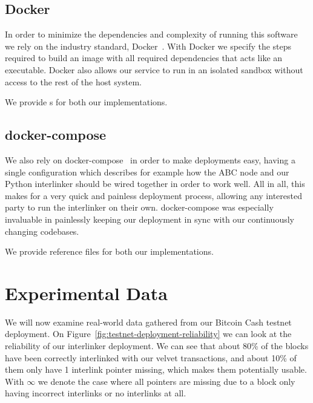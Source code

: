 \subsection{Docker}

In order to minimize the dependencies and complexity of running this software we rely on the industry standard, Docker~\cite{docker}. With Docker we specify the steps required to build an image with all required dependencies that acts like an executable. Docker also allows our service to run in an isolated sandbox without access to the rest of the host system.

We provide s for both our implementations.

\subsection{docker-compose}

We also rely on docker-compose~\cite{docker-compose} in order to make deployments easy, having a single configuration which describes for example how the ABC node and our Python interlinker should be wired together in order to work well. All in all, this makes for a very quick and painless deployment process, allowing any interested party to run the interlinker on their own. docker-compose was especially invaluable in painlessly keeping our deployment in sync with our continuously changing codebases.

We provide reference  files for both our implementations.

\section{Experimental Data}

We will now examine real-world data gathered from our Bitcoin Cash testnet deployment. On Figure~\ref{fig:testnet-deployment-reliability} we can look at the reliability of our interlinker deployment. We can see that about 80\% of the blocks have been correctly interlinked with our velvet transactions, and about 10\% of them only have 1 interlink pointer missing, which makes them potentially usable. With $\infty$ we denote the case where all pointers are missing due to a block only having incorrect interlinks or no interlinks at all.


